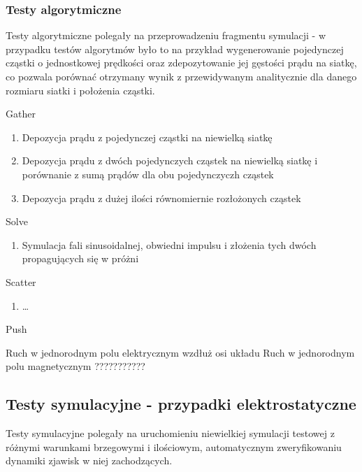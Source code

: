     \subsubsection{Testy algorytmiczne}
    Testy algorytmiczne polegały na przeprowadzeniu fragmentu symulacji - w
    przypadku testów algorytmów było to na przykład wygenerowanie pojedynczej
    cząstki o jednostkowej prędkości oraz zdepozytowanie jej gęstości prądu na
    siatkę, co pozwala porównać otrzymany wynik z przewidywanym analitycznie
    dla danego rozmiaru siatki i położenia cząstki.
    \begin{enumerate}
        \itemi Gather
            \begin{enumerate}
                \item Depozycja prądu z pojedynczej cząstki na niewielką siatkę
                \item Depozycja prądu z dwóch pojedynczych cząstek na niewielką
                    siatkę i porównanie z sumą prądów dla obu pojedynczyczh
                    cząstek
                \item Depozycja prądu z dużej ilości równomiernie rozłożonych
                    cząstek
            \end{enumerate}

        \itemi Solve
            \begin{enumerate}
                \item Symulacja fali sinusoidalnej, obwiedni impulsu i złożenia
                    tych dwóch propagujących się w próżni
            \end{enumerate}

        \itemi Scatter
            \begin{enumerate}
                \item \ldots {}
            \end{enumerate}

        \itemi Push
            \begin{enumerate}
                \itemii Ruch w jednorodnym polu elektrycznym wzdłuż osi układu
                \itemii Ruch w jednorodnym polu magnetycznym ???????????
                \itemii {}
            \end{enumerate}
    \end{enumerate}

    \subsection{Testy symulacyjne - przypadki elektrostatyczne}
    Testy symulacyjne polegały na uruchomieniu niewielkiej symulacji testowej z
    różnymi warunkami brzegowymi i ilościowym, automatycznym zweryfikowaniu
    dynamiki zjawisk w niej zachodzących.


